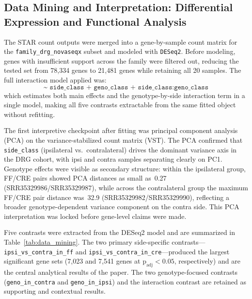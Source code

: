 \documentclass[12pt]{article}
\begin{document}
\subsection{Data Mining and Interpretation: Differential Expression and Functional Analysis}

The STAR count outputs were merged into a gene-by-sample count matrix for the
\texttt{family\_drg\_novaseqx} subset and modeled with \texttt{DESeq2}.
Before modeling, genes with insufficient support across the family were filtered out,
reducing the tested set from 78{,}334 genes to 21{,}481 genes while retaining all 20 samples.
The full interaction model applied was:
\[ \texttt{\textasciitilde{}\ side\_class + geno\_class + side\_class{:}geno\_class} \]
which estimates both main effects and the genotype-by-side interaction term in a single model,
making all five contrasts extractable from the same fitted object without refitting.

The first interpretive checkpoint after fitting was principal component analysis (PCA) on the
variance-stabilized count matrix (VST).
The PCA confirmed that \texttt{side\_class} (ipsilateral vs.\ contralateral) drives the
dominant variance axis in the DRG cohort, with ipsi and contra samples separating clearly on
PC1.
Genotype effects were visible as secondary structure: within the ipsilateral group, FF/CRE
pairs showed PCA distances as small as~0.27 (SRR35329986/SRR35329987), while across the
contralateral group the maximum FF/CRE pair distance was~32.9
(SRR35329982/SRR35329990), reflecting a broader genotype-dependent variance component on the
contra side.
This PCA interpretation was locked before gene-level claims were made.

Five contrasts were extracted from the DESeq2 model and are summarized in
Table~\ref{tab:data_mining}.
The two primary side-specific contrasts---\texttt{ipsi\_vs\_contra\_in\_ff} and
\texttt{ipsi\_vs\_contra\_in\_cre}---produced the largest significant gene sets (7{,}023 and
7{,}541 genes at $\text{p}_{\text{adj}} < 0.05$, respectively) and are the central analytical
results of the paper.
The two genotype-focused contrasts (\texttt{geno\_in\_contra} and \texttt{geno\_in\_ipsi}) and
the interaction contrast are retained as supporting and contextual results.
\end{document}
